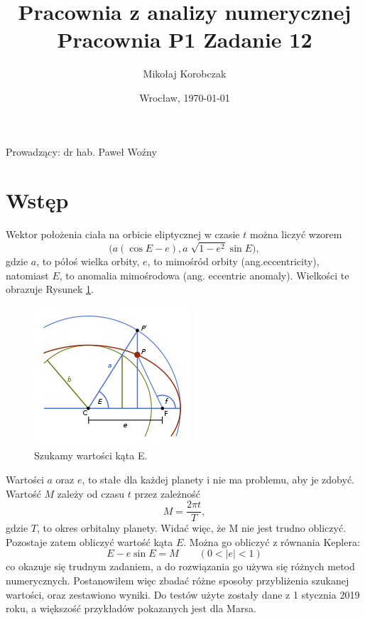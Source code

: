 \documentclass[11pt,wide]{mwart}
\date{Wrocław, \today}
\title{\LARGE\textbf{Pracownia z analizy numerycznej}\\Pracownia P1 Zadanie 12}
\author{Mikołaj Korobczak}
\begin{document}
\maketitle
\begin{center}
Prowadzący: dr hab. Paweł Woźny
\end{center}
\thispagestyle{empty}
\tableofcontents

\section{Wstęp}
Wektor położenia ciała na orbicie eliptycznej w czasie $t$ można liczyć wzorem
\begin{equation}
\Big( a(\cos E - e), a\sqrt[]{1-e^2} \sin E\Big),
\end{equation}
gdzie $a$, to półoś wielka orbity, $e$, to mimośród orbity (ang.eccentricity), natomiast $E$, to anomalia mimośrodowa (ang. eccentric anomaly). Wielkości te obrazuje Rysunek \ref{R1}.
\begin{figure}[H] \label{R1}
	\begin{center}
	\includegraphics[scale=0.7]{Eccentric_Anomaly}
	\end{center}
	\caption{Szukamy wartości kąta E.}
\end{figure}
Wartości $a$ oraz $e$, to stałe dla każdej planety i nie ma problemu, aby je zdobyć. Wartość $M$ zależy od czasu $t$ przez zależność 
\begin{equation}
M = \frac{2\pi t}{T},
\end{equation}
gdzie $T$, to okres orbitalny planety.
Widać więc, że M nie jest trudno obliczyć. Pozostaje zatem obliczyć wartość kąta $E$. Można go obliczyć z równania Keplera:
\begin{equation}
E - e \sin E = M \qquad (0 < |e| < 1)
\end{equation}
co okazuje się trudnym zadaniem, a do rozwiązania go używa się różnych metod numerycznych. Postanowiłem więc zbadać różne sposoby przybliżenia szukanej wartości, oraz zestawiono wyniki.
Do testów użyte zostały dane z 1 stycznia 2019 roku, a większość przykładów pokazanych jest dla Marsa.
\end{document}
